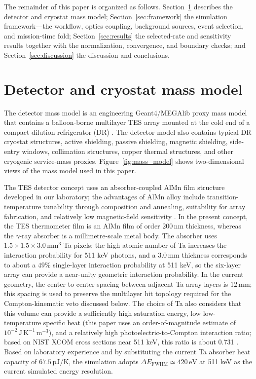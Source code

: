 \documentclass[pdflatex,sn-mathphys-num]{sn-jnl}
\begin{document}
The remainder of this paper is organized as follows. Section~\ref{sec:geometry} describes the detector and cryostat mass model; Section~\ref{sec:framework} the simulation framework---the workflow, optics coupling, background sources, event selection, and mission-time fold; Section~\ref{sec:results} the selected-rate and sensitivity results together with the normalization, convergence, and boundary checks; and Section~\ref{sec:discussion} the discussion and conclusions.

\section{Detector and cryostat mass model}
\label{sec:geometry}

The detector mass model is an engineering Geant4/MEGAlib proxy mass model that contains a balloon-borne multilayer TES array mounted at the cold end of a compact dilution refrigerator (DR) \cite{Shirazi2023,Gottardi2021TESReview}. The detector model also contains typical DR cryostat structures, active shielding, passive shielding, magnetic shielding, side-entry windows, collimation structures, copper thermal structures, and other cryogenic service-mass proxies. Figure~\ref{fig:mass_model} shows two-dimensional views of the mass model used in this paper.

The TES detector concept uses an absorber-coupled AlMn film structure developed in our laboratory; the advantages of AlMn alloy include transition-temperature tunability through composition and annealing, suitability for array fabrication, and relatively low magnetic-field sensitivity \cite{Xie2026AlMn,Vavagiakis2017AlMnMagnetic}. In the present concept, the TES thermometer film is an AlMn film of order $200\,\mathrm{nm}$ thickness, whereas the $\gamma$-ray absorber is a millimetre-scale metal body. The absorber uses $1.5\times1.5\times3.0\,\mathrm{mm^3}$ Ta pixels; the high atomic number of Ta increases the interaction probability for 511 keV photons, and a $3.0\,\mathrm{mm}$ thickness corresponds to about a $49\%$ single-layer interaction probability at 511 keV, so the six-layer array can provide a near-unity geometric interaction probability. In the current geometry, the center-to-center spacing between adjacent Ta array layers is $12\,\mathrm{mm}$; this spacing is used to preserve the multilayer hit topology required for the Compton-kinematic veto discussed below. The choice of Ta also considers that this volume can provide a sufficiently high saturation energy, low low-temperature specific heat (this paper uses an order-of-magnitude estimate of $10^{-2}\,\mathrm{J\,K^{-1}\,m^{-3}}$), and a relatively high photoelectric-to-Compton interaction ratio; based on NIST XCOM cross sections near 511 keV, this ratio is about 0.731 \cite{NISTXCOM}. Based on laboratory experience and by substituting the current Ta absorber heat capacity of $67.5\,\mathrm{pJ/K}$, the simulation adopts $\Delta E_{\mathrm{FWHM}}\simeq420\,\mathrm{eV}$ at 511 keV as the current simulated energy resolution.
\end{document}
